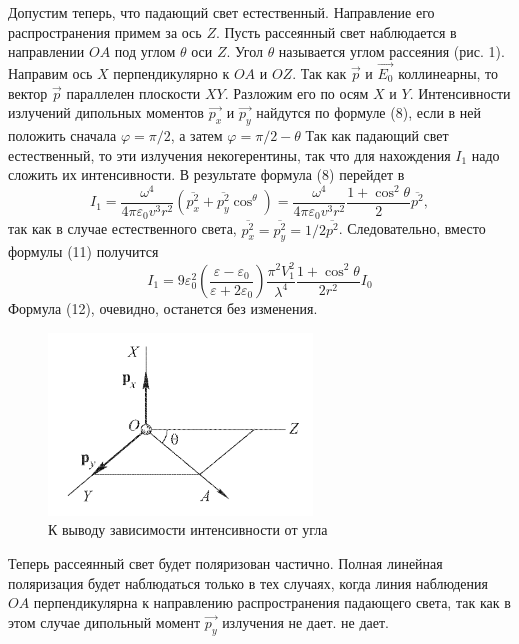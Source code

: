 \documentclass[14pt]{article}
\begin{document}
Допустим теперь, что падающий свет естественный. Направление его распространения примем за ось $Z$. Пусть рассеянный свет наблюдается в направлении $OA$ под углом $\theta$ оси $Z$. Угол $\theta$ называется углом рассеяния (рис. 1). Направим ось $X$ перпендикулярно к $OA$ и $OZ$. Так как $\vec{p}$ и $\vec{E_0}$ коллинеарны, то вектор $\vec{p}$ параллелен плоскости $XY$. Разложим его по осям $X$ и $Y$. Интенсивности излучений дипольных моментов $\vec{p_x}$ и $\vec{p_y}$ найдутся по формуле (8), если в ней положить сначала $\varphi = \pi/2$, а затем $\varphi = \pi/2 - \theta$ Так как падающий свет естественный, то эти излучения некогерентины, так что для нахождения $I_1$ надо сложить их интенсивности. В результате формула (8) перейдет в
$$
	I_1 =   \frac{\omega^4}{4\pi\varepsilon_0v^3r^2}(\overline{p_x^2} + \overline{p_y^2}\cos^\theta) = 
			\frac{\omega^4}{4\pi\varepsilon_0v^3r^2}\frac{1+\cos^2\theta}{2}\overline{p^2},
$$
так как в случае естественного света, $\overline{p_x^2} = \overline{p_y^2} = 1/2\overline{p^2}$. Следовательно, вместо формулы (11) получится
\begin{equation}
	I_1 = 9\varepsilon_0^2\left(\frac{\varepsilon - \varepsilon_0}{\varepsilon + 2\varepsilon_0}\right)\frac{\pi^2V_1^2}{\lambda^4}\frac{1+\cos^2\theta}{2r^2}I_0
\end{equation}
Формула (12), очевидно, останется без изменения.

\begin{figure}
\centering
	\includegraphics[width=7cm]{1.png}
	\caption{К выводу зависимости интенсивности от угла}
\end{figure}

Теперь рассеянный свет будет поляризован частично. Полная линейная поляризация будет наблюдаться только в тех случаях, когда линия наблюдения $OA$ перпендикулярна к направлению распространения падающего света, так как в этом случае дипольный момент $\vec{p_y}$ излучения не дает. 
не дает.
\end{document}
